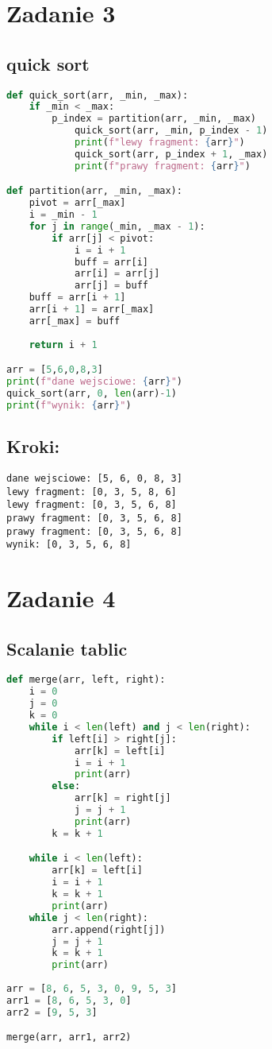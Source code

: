 \documentclass{article}
\begin{document}
	\section{Zadanie 3}
		\subsection{quick sort}
			\begin{lstlisting}[language=python, caption={implementacja quick sort}]
def quick_sort(arr, _min, _max):
	if _min < _max:
		p_index = partition(arr, _min, _max)
			quick_sort(arr, _min, p_index - 1)
			print(f"lewy fragment: {arr}")
			quick_sort(arr, p_index + 1, _max)
			print(f"prawy fragment: {arr}")

def partition(arr, _min, _max):
	pivot = arr[_max]
	i = _min - 1
	for j in range(_min, _max - 1):
		if arr[j] < pivot:
			i = i + 1
			buff = arr[i]
			arr[i] = arr[j]
			arr[j] = buff
	buff = arr[i + 1]
	arr[i + 1] = arr[_max]
	arr[_max] = buff
	
	return i + 1

arr = [5,6,0,8,3]
print(f"dane wejsciowe: {arr}")
quick_sort(arr, 0, len(arr)-1)
print(f"wynik: {arr}")
			\end{lstlisting}
		\subsection{Kroki:}
			\begin{lstlisting}
dane wejsciowe: [5, 6, 0, 8, 3]
lewy fragment: [0, 3, 5, 8, 6]
lewy fragment: [0, 3, 5, 6, 8]
prawy fragment: [0, 3, 5, 6, 8]
prawy fragment: [0, 3, 5, 6, 8]
wynik: [0, 3, 5, 6, 8]
			\end{lstlisting}
	\section{Zadanie 4}
		\subsection{Scalanie tablic}
			\begin{lstlisting}[language=python, caption={implementacja scalania tablic}]
def merge(arr, left, right):
	i = 0
	j = 0
	k = 0
	while i < len(left) and j < len(right):
		if left[i] > right[j]:
			arr[k] = left[i]
			i = i + 1
			print(arr)
		else:
			arr[k] = right[j]
			j = j + 1
			print(arr)
		k = k + 1

	while i < len(left):
		arr[k] = left[i]
		i = i + 1
		k = k + 1
		print(arr)
	while j < len(right):
		arr.append(right[j])
		j = j + 1
		k = k + 1
		print(arr)
		
arr = [8, 6, 5, 3, 0, 9, 5, 3]
arr1 = [8, 6, 5, 3, 0]
arr2 = [9, 5, 3]

merge(arr, arr1, arr2)
			\end{lstlisting}
\end{document}
